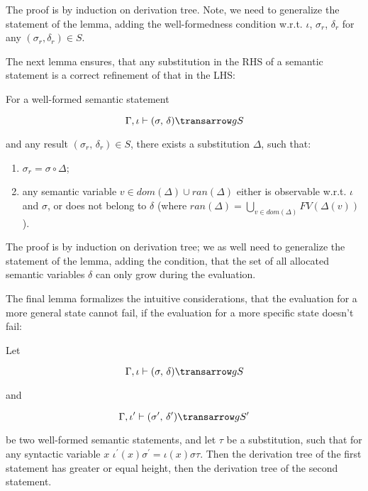 The proof is by induction on derivation tree. Note, we need to generalize the statement of the lemma, adding the well-formedness
condition w.r.t. $\iota$, $\sigma_r$, $\delta_r$ for any $(\sigma_r, \delta_r) \in S$.

The next lemma ensures, that any substitution in the RHS of a semantic statement is a correct refinement of that in the LHS:

\begin{lemma}
\label{two}
\normalfont
For a well-formed semantic statement 

$$
\otrans{\Gamma,\iota}{(\sigma,\,\delta)}{g}{S}
$$ 

\noindent and any result \mbox{$(\sigma_r,\,\delta_r) \in S$}, there exists a substitution $\Delta$, such that:
  \begin{enumerate}
    \item \mbox{$\sigma_r = \sigma\circ\Delta$};
    \item any semantic variable \mbox{$v\in dom(\Delta)\cup ran(\Delta)$} either is observable w.r.t. $\iota$ and $\sigma$,
 or does not belong to $\delta$ (where $ran(\Delta)=\bigcup_{v\in dom(\Delta)}FV(\Delta(v))$).
  \end{enumerate}   
\end{lemma}

The proof is by induction on derivation tree; we as well need to generalize the statement of the lemma, adding the condition, that the 
set of all allocated semantic variables $\delta$ can only grow during the evaluation.

The final lemma formalizes the intuitive considerations, that the evaluation for a more general state cannot fail, if the evaluation 
for a more specific state doesn't fail:

\begin{lemma}
\label{three}
\normalfont
Let 

$$
\otrans{\Gamma,\iota}{(\sigma,\,\delta)}{g}{S}
$$ 

and 

$$\otrans{\Gamma,\iota^\prime}{(\sigma^\prime,\,\delta^\prime)}{g}{S^\prime}
$$

\noindent be two well-formed semantic statements, and let $\tau$ be a substitution, such that 
for any syntactic variable $x$ \mbox{$\iota^\prime(x) \sigma^\prime = \iota(x) \sigma \tau$}. Then the 
derivation tree of the first statement has greater or equal height, then the derivation 
tree of the second statement.
\end{lemma}

